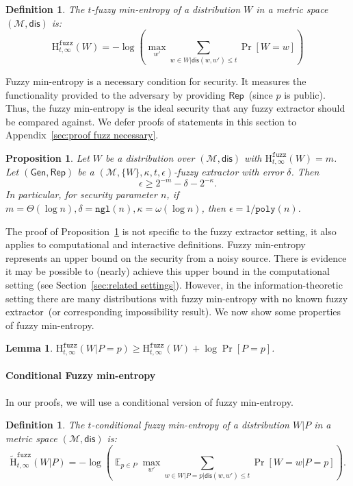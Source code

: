 \documentclass[11pt]{article}
\newtheorem{lemma}[theorem]{Lemma}
\newtheorem{proposition}[theorem]{Proposition}
\newtheorem{definition}[theorem]{Definition}
\newcommand{\secref}[1]{\mbox{Section~\ref{#1}}}
\newcommand{\apref}[1]{\mbox{Appendix~\ref{#1}}}
\newcommand{\lemref}[1]{\mbox{Lemma~\ref{#1}}}
\newcommand{\propref}[1]{\mbox{Proposition~\ref{#1}}}
\DeclareMathOperator*{\expe}{\mathbb{E}}
\newcommand{\class}[1]{{\ensuremath{\mathsf{#1}}}}
\newcommand{\gen}{\ensuremath{\class{Gen}}\xspace}
\newcommand{\rep}{\ensuremath{\class{Rep}}\xspace}
\newcommand{\dis}{\ensuremath{\mathsf{dis}}}
\newcommand{\poly}{\ensuremath{\mathtt{poly}}\xspace}
\newcommand{\ngl}{\ensuremath{\mathtt{ngl}}\xspace}
\newcommand{\Hfuzz}{\mathrm{H}^{\mathtt{fuzz}}_{t,\infty}}
\newcommand{\Hfav}{\tilde{\mathrm{H}}^{\mathtt{fuzz}}_{t,\infty}}
\begin{document}
\begin{definition}
\label{def:fuzzy min-ent}
The $t$-fuzzy min-entropy of a distribution $W$ in a metric space $(\mathcal{M}, \dis)$ is:
\[
\Hfuzz(W) = -\log \left(\max_{w'}  \sum_{w\in W | \dis(w, w')\le t} \Pr[W=w] \right)
\]
\end{definition}
\noindent
Fuzzy min-entropy is a necessary condition for security.  It measures the functionality provided to the adversary by providing $\rep$~(since $p$ is public).  Thus, the fuzzy min-entropy is the ideal security that any fuzzy extractor should be compared against.  We defer proofs of statements in this section to \apref{sec:proof fuzz necessary}.
\begin{proposition}
\label{prop:fuzz necessary}
Let $W$ be a distribution  over $(\mathcal{M}, \dis)$ with $\Hfuzz(W) =m$.  Let $(\gen, \rep)$ be a $(\mathcal{M}, \{W\}, \kappa, t, \epsilon)$-fuzzy extractor with error $\delta$.  Then 
\[
\epsilon\ge 2^{-m}-\delta -2^{-\kappa}.
\]
In particular, for security parameter $n$, if $m = \Theta(\log n), \delta = \ngl(n), \kappa = \omega(\log n)$, then $\epsilon  = 1/\poly(n)$.
\end{proposition}

The proof of \propref{prop:fuzz necessary} is not specific to the fuzzy extractor setting, it also applies to computational and interactive definitions.  Fuzzy min-entropy represents an upper bound on the security from a noisy source.  There is evidence it may be possible to (nearly) achieve this upper bound in the computational setting (see \secref{sec:related settings}).  However, in the information-theoretic setting there are many distributions with fuzzy min-entropy with no known fuzzy extractor~(or corresponding impossibility result).  We now show some properties of fuzzy min-entropy.
\begin{lemma}
\label{lem:conditional fuzz rule}
$\Hfuzz(W|P=p) \ge \Hfuzz(W) + \log \Pr[P=p]$.
\end{lemma}

\paragraph{Conditional Fuzzy min-entropy}
In our proofs, we will use a conditional version of fuzzy min-entropy.
\begin{definition}
\label{def:cond fuzzy ent}
The $t$-conditional fuzzy min-entropy of a distribution $W |P$ in a metric space $(\mathcal{M}, \dis)$ is:
\[
\Hfav(W|P) = -\log \left( \expe_{p\in P} \max_{w'} \sum_{w\in W |P =p | \dis(w, w')\le t} \Pr[W=w|P=p]\right).
\]
\end{definition}
\end{document}
